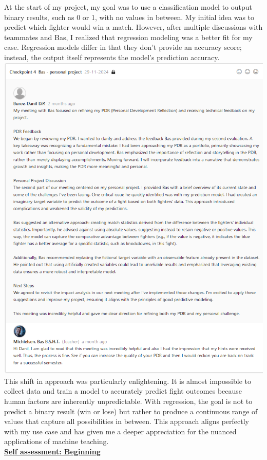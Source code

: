 \documentclass{article}
\begin{document}
	
	At the start of my project, my goal was to use a classification model to output binary results, such as 0 or 1, with no values in between. My initial idea was to predict which fighter would win a match. However, after multiple discussions with teammates and Bas, I realized that regression modeling was a better fit for my case. Regression models differ in that they don’t provide an accuracy score; instead, the output itself represents the model's prediction accuracy.\\
	\includegraphics[width=\textwidth]{images/Feedback_Bas_1.png}\\
	
	This shift in approach was particularly enlightening. It is almost impossible to collect data and train a model to accurately predict fight outcomes because human factors are inherently unpredictable. With regression, the goal is not to predict a binary result (win or lose) but rather to produce a continuous range of values that capture all possibilities in between. This approach aligns perfectly with my use case and has given me a deeper appreciation for the nuanced applications of machine teaching.\\
	  \underline{\textbf{Self assessment: Beginning}}
	
\end{document}
